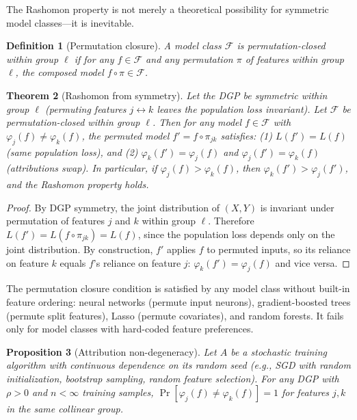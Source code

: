 \documentclass{article}
\newtheorem{theorem}{Theorem}
\newtheorem{definition}[theorem]{Definition}
\newtheorem{proposition}[theorem]{Proposition}
\begin{document}
The Rashomon property is not merely a theoretical possibility for symmetric model classes---it is inevitable.

\begin{definition}[Permutation closure]
\label{def:perm-closure}
A model class $\mathcal{F}$ is \emph{permutation-closed} within group $\ell$ if for any $f \in \mathcal{F}$ and any permutation $\pi$ of features within group $\ell$, the composed model $f \circ \pi \in \mathcal{F}$.
\end{definition}

\begin{theorem}[Rashomon from symmetry]
\label{thm:rashomon-symmetry}
Let the DGP be symmetric within group $\ell$ (permuting features $j \leftrightarrow k$ leaves the population loss invariant). Let $\mathcal{F}$ be permutation-closed within group $\ell$. Then for any model $f \in \mathcal{F}$ with $\varphi_j(f) \neq \varphi_k(f)$, the permuted model $f' = f \circ \pi_{jk}$ satisfies: (1) $L(f') = L(f)$ (same population loss), and (2) $\varphi_k(f') = \varphi_j(f)$ and $\varphi_j(f') = \varphi_k(f)$ (attributions swap).
In particular, if $\varphi_j(f) > \varphi_k(f)$, then $\varphi_k(f') > \varphi_j(f')$, and the Rashomon property holds.
\end{theorem}

\begin{proof}
By DGP symmetry, the joint distribution of $(X, Y)$ is invariant under permutation of features $j$ and $k$ within group $\ell$. Therefore $L(f') = L(f \circ \pi_{jk}) = L(f)$, since the population loss depends only on the joint distribution. By construction, $f'$ applies $f$ to permuted inputs, so its reliance on feature $k$ equals $f$'s reliance on feature $j$: $\varphi_k(f') = \varphi_j(f)$ and vice versa.
\end{proof}

The permutation closure condition is satisfied by any model class without built-in feature ordering: neural networks (permute input neurons), gradient-boosted trees (permute split features), Lasso (permute covariates), and random forests. It fails only for model classes with hard-coded feature preferences.

\begin{proposition}[Attribution non-degeneracy]
\label{thm:non-degeneracy}
Let $A$ be a stochastic training algorithm with continuous dependence on its random seed (e.g., SGD with random initialization, bootstrap sampling, random feature selection). For any DGP with $\rho > 0$ and $n < \infty$ training samples, $\Pr[\varphi_j(f) \neq \varphi_k(f)] = 1$ for features $j, k$ in the same collinear group.
\end{proposition}
\end{document}
